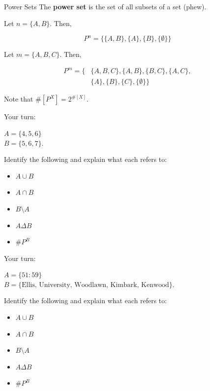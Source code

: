 \documentclass[10pt]{beamer}
\begin{document}
\begin{frame}{Power Sets}
    The \textbf{power set} is the set of all subsets of a set (phew).

    Let $n = \{A,B\}$. Then,

    \[P^n = \Big\{ \{A,B\},\{A\},\{B\},\{\emptyset\}\Big\}\]

    Let $m = \{A,B,C\}$. Then,

    
        \begin{align*}
        P^m = \Big\{&\{A,B,C\},\{A,B\},\{B,C\},\{A,C\},\\ 
        &\{A\},\{B\},\{C\},\{\emptyset\}\Big\}
        \end{align*}
    

    Note that $\#[P^X] = 2^{\#[X]}$.
\end{frame}

\begin{frame}{Your turn:}


$A = \{4,5,6\}$ \\
$B = \{5,6,7\}$.

Identify the following and explain what each refers to:

\begin{itemize}
    \item $A \cup B$

    \item $A \cap B$

    \item $B \setminus A$

    \item $A \Delta B$

    \item $\#P^B$
\end{itemize}

\end{frame}

\begin{frame}{Your turn:}


$A = \{51:59\}$ \\
$B = \{\text{Ellis, University, Woodlawn, Kimbark, Kenwood}\}$.

Identify the following and explain what each refers to:

\begin{itemize}
    \item $A \cup B$

    \item $A \cap B$

    \item $B \setminus A$

    \item $A \Delta B$

    \item $\#P^B$
\end{itemize}

\end{frame}
\end{document}

